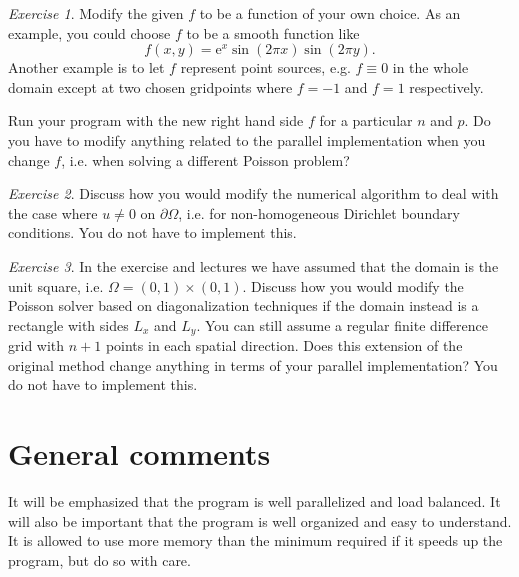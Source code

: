\documentclass[onecolumn, oneside, a4paper, 11pt]{memoir}
\theoremstyle{remark}
\newtheorem{ex}{Exercise}
\begin{document}
\begin{ex}
  Modify the given $f$ to be a function of your own choice. As an example, you
  could choose $f$ to be a smooth function like
  \[
    f(x, y) = \text{e}^x \sin(2\pi x) \sin(2 \pi y).
  \]
  Another example is to let $f$ represent point sources, e.g. $f \equiv 0$ in
  the whole domain except at two chosen gridpoints where $f=-1$ and $f=1$
  respectively.

  Run your program with the new right hand side $f$ for a particular $n$ and
  $p$. Do you have to modify anything related to the parallel implementation
  when you change $f$, i.e. when solving a different Poisson problem?
\end{ex}

\begin{ex}
  Discuss how you would modify the numerical algorithm to deal with the case
  where $u \not= 0$ on $\partial\Omega$, i.e. for non-homogeneous Dirichlet
  boundary conditions. You do not have to implement this.
\end{ex}

\begin{ex}
  In the exercise and lectures we have assumed that the domain is the unit
  square, i.e. $\Omega = (0,1) \times (0,1)$. Discuss how you would modify the
  Poisson solver based on diagonalization techniques if the domain instead is a
  rectangle with sides $L_x$ and $L_y$. You can still assume a regular finite
  difference grid with $n+1$ points in each spatial direction. Does this
  extension of the original method change anything in terms of your parallel
  implementation? You do not have to implement this.
\end{ex}

\section{General comments}

It will be emphasized that the program is well parallelized and load balanced.
It will also be important that the program is well organized and easy to
understand. It is allowed to use more memory than the minimum required if it
speeds up the program, but do so with care.
\end{document}
